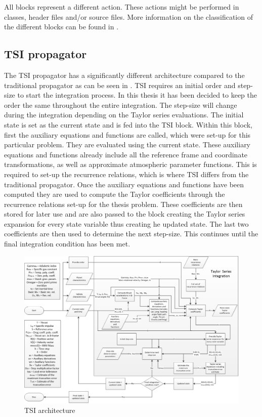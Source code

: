 All blocks represent a different action. These actions might be performed in classes, header files and/or source files. More information on the classification of the different blocks can be found in .

\subsection{\ac{TSI} propagator}
\label{subsec:tsipropagator}
The \ac{TSI} propagator has a significantly different architecture compared to the traditional propagator as can be seen in . \ac{TSI} requires an initial order and step-size to start the integration process. In this thesis it has been decided to keep the order the same throughout the entire integration. The step-size will change during the integration depending on the Taylor series evaluations. The initial state is set as the current state and is fed into the \ac{TSI} block. Within this block, first the auxiliary equations and functions are called, which were set-up for this particular problem. They are evaluated using the current state. These auxiliary equations and functions already include all the reference frame and coordinate transformations, as well as approximate atmospheric parameter functions. This is required to set-up the recurrence relations, which is where \ac{TSI} differs from the traditional propagator. Once the auxiliary equations and functions have been computed they are used to compute the Taylor coefficients through the recurrence relations set-up for the thesis problem. These coefficients are then stored for later use and are also passed to the block creating the Taylor series expansion for every state variable thus creating he updated state. The last two coefficients are then used to determine the next step-size. This continues until the final integration condition has been met. 


\begin{figure}[!ht]
\centering
\includegraphics[width=1.5\textwidth, angle = 90]{figures/software/TSI_Propagator.png}
\caption{\ac{TSI} architecture}
\label{fig:TSI_Propagator}
\end{figure}


